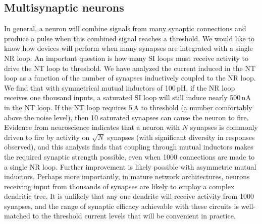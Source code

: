 \documentclass[aip,amsmath,amssymb,reprint,nofootinbib]{revtex4-1}
\begin{document}
\subsection{\label{sec:scaling}Multisynaptic neurons} 
In general, a neuron will combine signals from many synaptic connections and produce a pulse when this combined signal reaches a threshold. We would like to know how devices will perform when many synapses are integrated with a single NR loop. An important question is how many SI loops must receive activity to drive the NT loop to threshold. We have analyzed the current induced in the NT loop as a function of the number of synapses inductively coupled to the NR loop. We find that with symmetrical mutual inductors of 100\,pH, if the NR loop receives one thousand inputs, a saturated SI loop will still induce nearly 500\,nA in the NT loop. If the NT loop requires 5\,\textmu A to threshold (a number comfortably above the noise level), then 10 saturated synapses can cause the neuron to fire. Evidence from neuroscience indicates that a neuron with $N$ synapses is commonly driven to fire by activity on $\sqrt{N}$ synapses \cite{vrso1996,vora2005} (with significant diversity in responses observed), and this analysis finds that coupling through mutual inductors makes the required synaptic strength possible, even when 1000 connections are made to a single NR loop. Further improvement is likely possible with asymmetric mutual inductors. Perhaps more importantly, in mature network architectures, neurons receiving input from thousands of synapses are likely to employ a complex dendritic tree. It is unlikely that any one dendrite will receive activity from 1000 synapses, and the range of synaptic efficacy achievable with these circuits is well-matched to the threshold current levels that will be convenient in practice. 
\end{document}
